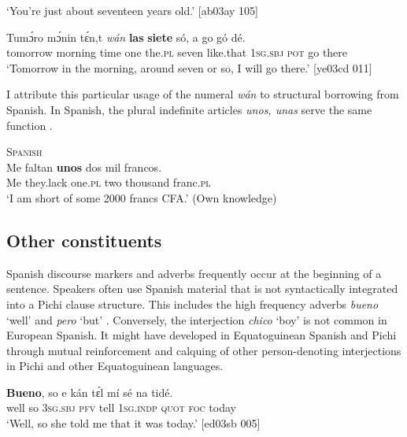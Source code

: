 \glt ‘You’re just about seventeen years old.’ [ab03ay 105]
\z


\ea%
    \label{ex:key:1733}
    \gll Tumɔ́ro    mɔ́nin  tɛ́n,t \textit{wán}  \textbf{las}    \textbf{siete}    só,    a    go  gó  dé.\\
tomorrow  morning  time    one  the.\textsc{pl}  seven  like.that  \textsc{1sg.sbj}  \textsc{pot}  go  there\\

\glt ‘Tomorrow in the morning, around seven or so, I will go there.’ [ye03cd 011]
\z

I attribute this particular usage of the numeral \textit{wán} to structural borrowing from Spanish. In Spanish, the plural indefinite articles \textit{unos, unas} serve the same function . 


\ea%
    \label{ex:key:1734}
\textsc{Spanish}\\
    \gll Me  faltan    \textbf{unos}  dos  mil      francos.\\
Me  they.lack    one.\textsc{pl}  two  thousand  franc.\textsc{pl}\\

\glt ‘I am short of some 2000 francs CFA.’ (Own knowledge)
\z

\subsection{Other constituents}

Spanish discourse markers and adverbs frequently occur at the beginning of a sentence. Speakers often use Spanish material that is not syntactically integrated into a Pichi clause structure. This includes the high frequency adverbs \textit{bueno} ‘well’  and \textit{pero} ‘but’ . Conversely, the interjection \textit{chico} ‘boy’  is not common in European Spanish. It might have developed in Equatoguinean Spanish and Pichi through mutual reinforcement and calquing of other person-denoting interjections in Pichi and other Equatoguinean languages.


\ea%
    \label{ex:key:1735}
    \gll \textbf{Bueno},  so  e    kán  tɛ́l  mí    sé    na  tidé.\\
well    so  \textsc{3sg.sbj}  \textsc{pfv}  tell  \textsc{1sg.indp}  \textsc{quot}    \textsc{foc}  today\\

\glt ‘Well, so she told me that it was today.’ [ed03sb 005]
\z


